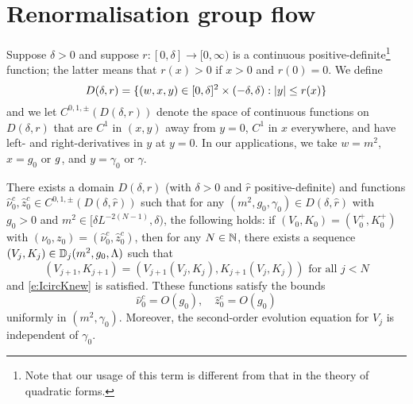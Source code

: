 \section{Renormalisation group flow}

Suppose $\delta > 0$ and suppose $r : [0, \delta] \to [0, \infty)$
is a continuous positive-definite\footnote{Note that our usage of this term is
different from that in the theory of quadratic forms.} function; the latter
means that $r(x) > 0$ if $x > 0$ and $r(0) = 0$.
We define
\begin{equation}
\lbeq{Ddef}
D(\delta, r)
	=
\{ (w, x, y) \in [0, \delta]^2 \times (-\delta, \delta) : |y| \leq r(x) \}
\end{equation}
and we let $C^{0,1,\pm}(D(\delta, r))$ denote the space of continuous functions on $D(\delta, r)$
that are $C^1$ in $(x, y)$ away from $y = 0$, $C^1$ in $x$ everywhere,
and have left- and right-derivatives in $y$ at $y = 0$.
In our applications, we take $w = m^2$, $x = g_0$ or $g$,
and $y = \gamma_0$ or $\gamma$.

\begin{theorem}
\label{thm:rhatflow}
There exists a domain $D(\delta, \hat r)$ (with $\delta > 0$ and $\hat r$
positive-definite) and functions $\hat\nu_0^c, \hat z_0^c \in C^{0,1,\pm}(D(\delta, \hat r))$
such that for any $(m^2, g_0, \gamma_0) \in D(\delta, \hat r)$
with $g_0 > 0$ and $m^2 \in [\delta L^{-2 (N - 1)}, \delta)$, the following holds:
if $(V_0, K_0) = (V^+_0, K^+_0)$ with $(\nu_0, z_0) = (\hat\nu_0^c, \hat z_0^c)$,
then for any $N \in {\mathbb N}$,
there exists a sequence $(V_j, K_j) \in \mathbb{D}_j(m^2, g_0, \Lambda)$ such that
\begin{equation}
	\label{e:VjKjDj-hat}
	(V_{j+1},K_{j+1}) = (V_{j+1}(V_j, K_j), K_{j+1}(V_j, K_j)) \text{ for all } j < N
\end{equation}
and \eqref{e:IcircKnew} is satisfied.
Tthese functions satisfy the bounds
\begin{equation}
\label{e:hat-est}
\hat\nu_0^c = O(g_0),
\quad
\hat z_0^c = O(g_0)
\end{equation}
uniformly in $(m^2, \gamma_0)$.
Moreover, the second-order evolution equation for $V_j$ is independent of $\gamma_0$.
\end{theorem}


